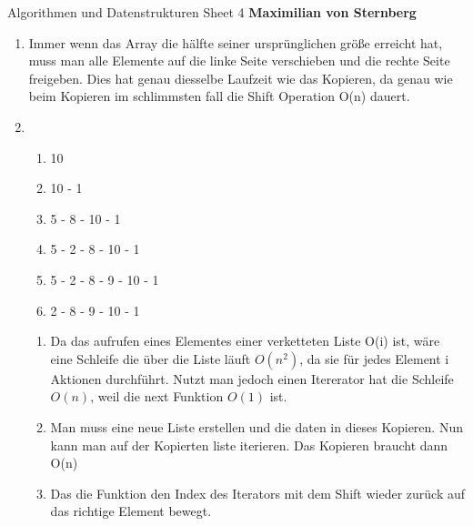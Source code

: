 \documentclass[]{book}
\theoremstyle{definition}
\begin{document}
\begin{center}
{\Large Algorithmen und Datenstrukturen \hspace{0.5cm} Sheet 4}
\textbf{Maximilian von Sternberg} %
\end{center}

\vspace{0.2 cm}

\begin{enumerate}
    \item Immer wenn das Array die hälfte seiner ursprünglichen größe erreicht hat, muss man alle Elemente auf die linke Seite verschieben und die rechte Seite freigeben. Dies hat genau diesselbe Laufzeit wie das Kopieren, da genau wie beim Kopieren im schlimmsten fall die Shift Operation O(n) dauert.
    \item \begin{enumerate}
        \item 10
        \item 10 - 1
        \item 5 - 8 - 10 - 1
        \item 5 - 2 - 8 - 10 - 1
        \item 5 - 2 - 8 - 9 - 10 - 1
        \item 2 - 8 - 9 - 10 - 1
    \end{enumerate}
    \begin{enumerate}
        \item Da das aufrufen eines Elementes einer verketteten Liste O(i) ist, wäre eine Schleife die über die Liste läuft $O(n^2)$, da sie für jedes Element i Aktionen durchführt. Nutzt man jedoch einen Itererator hat die Schleife $O(n)$, weil die next Funktion $O(1)$ ist.
        \item Man muss eine neue Liste erstellen und die daten in dieses Kopieren. Nun kann man  auf der Kopierten liste iterieren. Das Kopieren braucht dann O(n)
        \item Das die Funktion den Index des Iterators mit dem Shift wieder zurück auf das richtige Element bewegt.
    \end{enumerate} 
\end{enumerate}
\end{document}
